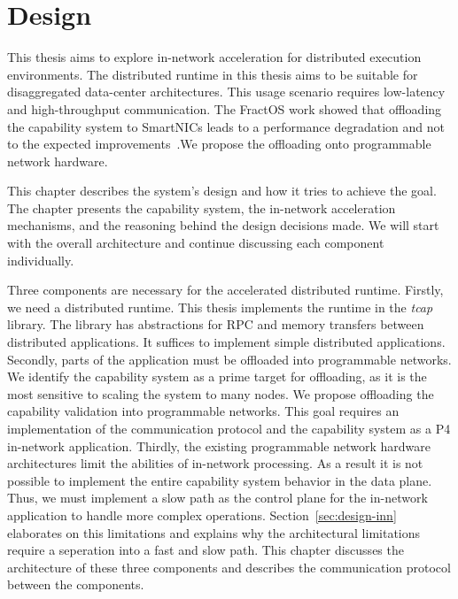 \chapter{Design}\label{chapter:design}
\thispagestyle{scrheadings}
This thesis aims to explore in-network acceleration for distributed execution environments. The distributed runtime in this thesis aims to be suitable for disaggregated data-center architectures. This usage scenario requires low-latency and high-throughput communication. The FractOS work showed that offloading the capability system to SmartNICs leads to a performance degradation and not to the expected improvements~\cite{vilanovaSlashingDisaggregationTax2022}.\@ We propose the offloading onto programmable network hardware.

This chapter describes the system's design and how it tries to achieve the goal. The chapter presents the capability system, the in-network acceleration mechanisms, and the reasoning behind the design decisions made. We will start with the overall architecture and continue discussing each component individually.

Three components are necessary for the accelerated distributed runtime. Firstly, we need a distributed runtime. This thesis implements the runtime in the \emph{tcap} library. The library has abstractions for \ac{RPC} and memory transfers between distributed applications. It suffices to implement simple distributed applications. Secondly, parts of the application must be offloaded into programmable networks. We identify the capability system as a prime target for offloading, as it is the most sensitive to scaling the system to many nodes. We propose offloading the capability validation into programmable networks. This goal requires an implementation of the communication protocol and the capability system as a P4 in-network application.
Thirdly, the existing programmable network hardware architectures limit the abilities of in-network processing. As a result it is not possible to implement the entire capability system behavior in the data plane. Thus, we must implement a slow path as the control plane for the in-network application to handle more complex operations. Section~\ref{sec:design-inn} elaborates on this limitations and explains why the architectural limitations require a seperation into a fast and slow path. This chapter discusses the architecture of these three components and describes the communication protocol between the components.

